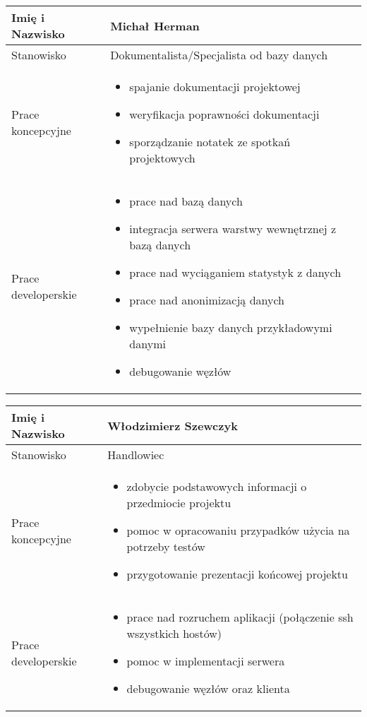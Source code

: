 \begin{longtable}{| p{} | p{} |}
\hline
Imię i Nazwisko & Michał Herman \\ \hline
Stanowisko & Dokumentalista/Specjalista od bazy danych \\ \hline
Prace koncepcyjne & \begin{itemize} 
\item spajanie dokumentacji projektowej 
\item weryfikacja poprawności dokumentacji 
\item sporządzanie notatek ze spotkań projektowych \end{itemize} \\ \hline
Prace developerskie & \begin{itemize}
\item prace nad bazą danych
\item integracja serwera warstwy wewnętrznej z bazą danych
\item prace nad wyciąganiem statystyk z danych
\item prace nad anonimizacją danych
\item wypełnienie bazy danych przykładowymi danymi
\item debugowanie węzłów
\end{itemize} \\ \hline
\end{longtable}

\begin{longtable}{| p{} | p{} |}
\hline
Imię i Nazwisko & Włodzimierz Szewczyk \\ \hline
Stanowisko & Handlowiec \\ \hline
Prace koncepcyjne & \begin{itemize} 
\item zdobycie podstawowych informacji o przedmiocie projektu 
\item pomoc w opracowaniu przypadków użycia na potrzeby testów
\item przygotowanie prezentacji końcowej projektu \end{itemize} \\ \hline
Prace developerskie & \begin{itemize}
\item prace nad rozruchem aplikacji (połączenie ssh wszystkich hostów)
\item pomoc w implementacji serwera
\item debugowanie węzłów oraz klienta
\end{itemize} \\ \hline
\end{longtable}

